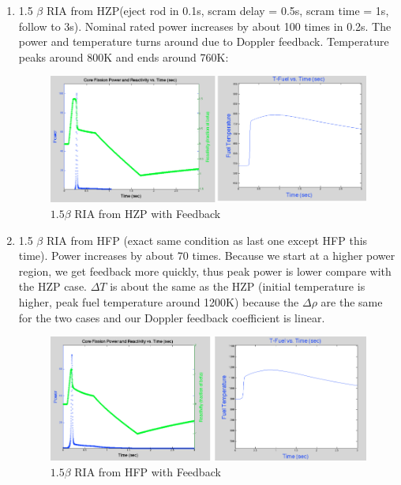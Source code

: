 \documentclass{school-22.211-notes}
\begin{document}
\begin{enumerate}

\clearpage
\item 1.5 $\beta$ RIA from HZP(eject rod in 0.1s, scram delay = 0.5s, scram time = 1s, follow to 3s). Nominal rated power increases by about 100 times in 0.2s. The power and temperature turns around due to Doppler feedback. Temperature peaks around 800K and ends around 760K: 

\begin{figure}[ht]
  \centering
  \includegraphics[width=6in]{images/pke/fn7.png}
  \caption{$1.5\beta$ RIA from HZP with Feedback}
\end{figure}


\item 1.5 $\beta$ RIA from HFP (exact same condition as last one except HFP this time). Power increases by about 70 times. Because we start at a higher power region, we get feedback more quickly, thus peak power is lower compare with the HZP case. $\Delta T$ is about the same as the HZP (initial temperature is higher, peak fuel temperature around 1200K) because the $\Delta \rho$ are the same for the two cases and our Doppler feedback coefficient is linear. 
\begin{figure}[ht]
  \centering
  \includegraphics[width=6in]{images/pke/fn8.png}
  \caption{$1.5\beta$ RIA from HFP with Feedback}
\end{figure}


\end{enumerate}
\end{document}
